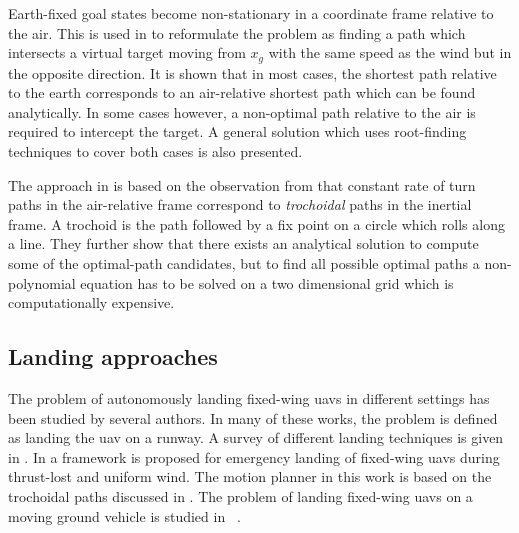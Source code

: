 Earth-fixed goal states become non-stationary in a coordinate frame relative to the air. 
This is used in \cite{optimal_path_target} to reformulate the problem as 
finding a path which intersects a virtual target moving from $x_g$ with the same speed as the wind but in the opposite direction. 
It is shown that in most cases, the shortest path relative to the earth corresponds to an air-relative shortest path which can be found analytically.
In some cases however, a non-optimal path relative to the air is required to 
intercept the target. A general solution which uses root-finding techniques to cover both cases is also presented.

The approach in \cite{optimal_path_trochoidal} is based on the observation from \cite{course_hdg_wind} that 
constant rate of turn paths in the air-relative frame correspond to \textit{trochoidal} paths in the inertial frame. A trochoid is the path followed by a fix point on a circle which rolls along a line.
They further show that there exists an analytical solution to compute some of the optimal-path candidates, but to find 
all possible optimal paths a non-polynomial equation has to be solved on a two dimensional grid which is computationally expensive.

\subsection{Landing approaches}
The problem of autonomously landing fixed-wing \acp{uav} in different settings has been studied by several authors. 
In many of these works, the problem is defined as landing the \ac{uav} on a runway. A survey of different landing techniques is given in \cite{survey_landing}.
In \cite{emergency_landing} a framework is proposed for emergency landing of fixed-wing \acp{uav} during thrust-lost and uniform wind. The motion planner in this work is based on the 
trochoidal paths discussed in \cite{optimal_path_trochoidal}. The problem of landing fixed-wing \acp{uav} on a moving ground vehicle is studied in \eg\ \cite{landing_on_vehicle}.